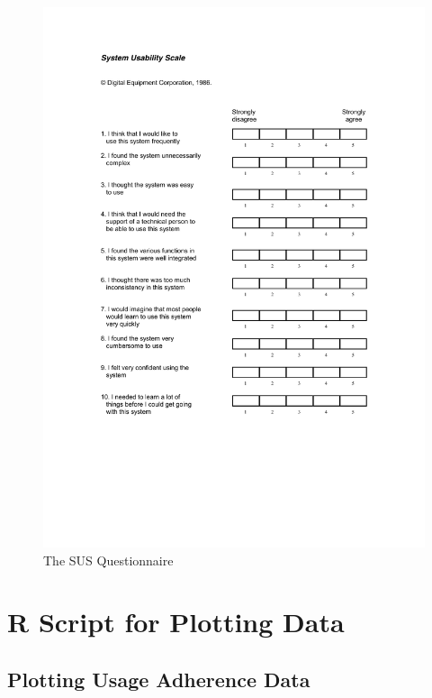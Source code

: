 \begin{figure}[h]
    \centering
    \includegraphics[width=1.0\textwidth]{./images/SUS.pdf}
    \caption{The \acf{SUS} Questionnaire}
    \label{fig:sus}
\end{figure}


\chapter{R Script for Plotting Data}
\label{app:r_script}

\section{Plotting Usage Adherence Data}

